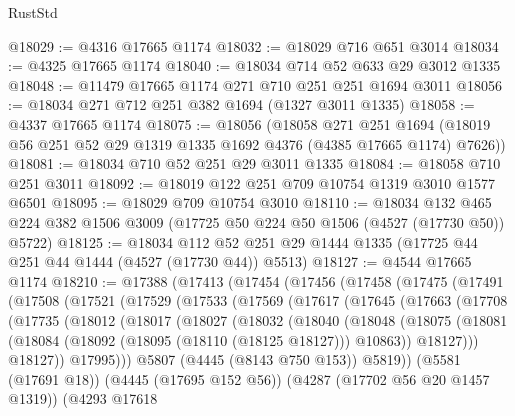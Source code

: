 \begin{lexlean}{RustStd}
\begin{coremodule}
{\begin{coremodule}
{{{{{{{{{{{{{{{{{{{{{{{{{{{{{{{{{{{{{{@18029 := @4316 @17665 @1174
@18032 := @18029 @716 @651 @3014
@18034 := @4325 @17665 @1174
@18040 := @18034 @714 @52 @633 @29 @3012 @1335
@18048 := @11479 @17665 @1174 @271 @710 @251 @251 @1694 @3011
@18056 := @18034 @271 @712 @251 @382 @1694 (@1327 @3011 @1335)
@18058 := @4337 @17665 @1174
@18075 := @18056
    (@18058
      @271
      @251
      @1694
      (@18019 @56 @251 @52 @29 @1319 @1335 @1692 @4376 (@4385 @17665 @1174) @7626))
@18081 := @18034 @710 @52 @251 @29 @3011 @1335
@18084 := @18058 @710 @251 @3011
@18092 := @18019 @122 @251 @709 @10754 @1319 @3010 @1577 @6501
@18095 := @18029 @709 @10754 @3010
@18110 := @18034
    @132
    @465
    @224
    @382
    @1506
    @3009
    (@17725 @50 @224 @50 @1506 (@4527 (@17730 @50)) @5722)
@18125 := @18034
    @112
    @52
    @251
    @29
    @1444
    @1335
    (@17725 @44 @251 @44 @1444 (@4527 (@17730 @44)) @5513)
@18127 := @4544 @17665 @1174
@18210 := @17388
    (@17413
      (@17454
        (@17456
          (@17458
            (@17475
              (@17491
                (@17508
                  (@17521
                    (@17529
                      (@17533
                        (@17569
                          (@17617
                            (@17645
                              (@17663
                                (@17708
                                  (@17735
                                    (@18012
                                      (@18017
                                        (@18027
                                          (@18032
                                            (@18040
                                              (@18048
                                                (@18075
                                                  (@18081
                                                    (@18084
                                                      (@18092
                                                        (@18095 (@18110 (@18125 @18127)))
                                                        @10863))
                                                    @18127)))
                                              @18127))
                                          @17995)))
                                    @5807
                                    (@4445 (@8143 @750 @153))
                                    @5819))
                                (@5581 (@17691 @18))
                                (@4445 (@17695 @152 @56))
                                (@4287 (@17702 @56 @20 @1457 @1319))
                                (@4293
                                  @17618
}}}}}}}}}}}}}}}}}}}}}}}}}}}}}}}}}}}}}}
\end{coremodule}}
\end{coremodule}
\end{lexlean}
